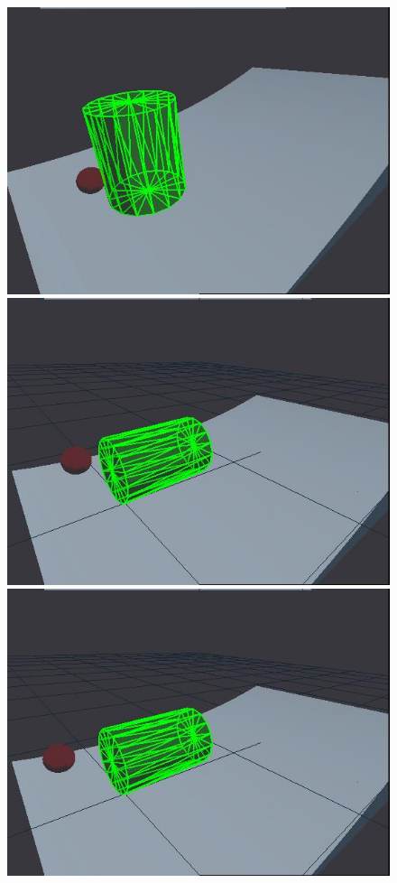 \begin{figure}[htbp]
{}
\centerline{
\includegraphics[width=\imgwid]{./A00050}
\includegraphics[width=\imgwid]{./B00300}
\includegraphics[width=\imgwid]{./C00950}
}
\end{figure}
